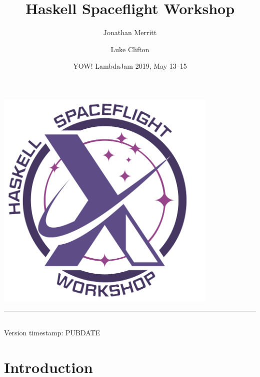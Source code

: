 \documentclass[12pt,openany]{book}
\title{Haskell Spaceflight Workshop}
\author{Jonathan Merritt \and Luke Clifton}
\date{YOW! LambdaJam 2019, May 13--15}
\begin{document}
\begin{titlepage}
\begin{center}
  \vspace*{1.5cm}
  {\Huge\textsf{\MakeUppercase{\thetitle}}}\par
  \vspace{1.cm}
  \includegraphics[width=0.8\textwidth]{fig/logo-text.pdf}\par
  \vspace{1.cm}
  {\Large\textsf{\theauthor}}\par
  \vspace{0.2em}
  {\Large\textsf{\thedate}}\par           
  \vspace{0.5cm}
  \rule{2cm}{0.5pt}\\\vspace{0.2cm}
  \textsf{Version timestamp: PUBDATE}
\end{center}
\end{titlepage}

\tableofcontents

\chapter{Introduction}
\end{document}
